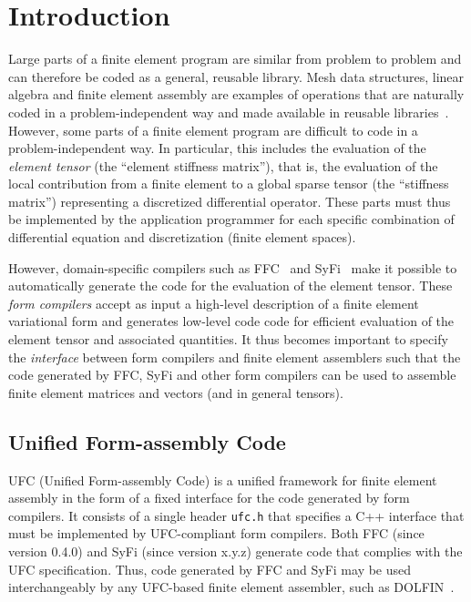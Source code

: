 \chapter{Introduction}
\label{sec:introduction}

Large parts of a finite element program are similar from problem to
problem and can therefore be coded as a general, reusable library.
Mesh data structures, linear algebra and finite element assembly are
examples of operations that are naturally coded in a
problem-independent way and made available in reusable
libraries~\cite{www:fenics,www:petsc,www:sundance,www:deal.II,www:trilinos,www:diffpack}.
However, some parts of a finite element program are difficult to code
in a problem-independent way. In particular, this includes the
evaluation of the \emph{element tensor} (the ``element stiffness
matrix''), that is, the evaluation of the local contribution from a
finite element to a global sparse tensor (the ``stiffness matrix'')
representing a discretized differential operator. These parts must
thus be implemented by the application programmer for each specific
combination of differential equation and discretization (finite
element spaces).

However, domain-specific compilers such as
FFC~\cite{www:ffc,logg:article:07,logg:article:09,logg:article:10,logg:article:11}
and SyFi~\cite{www:syfi} make it possible to automatically generate
the code for the evaluation of the element tensor. These \emph{form
compilers} accept as input a high-level description of a finite
element variational form and generates low-level code code for
efficient evaluation of the element tensor and associated quantities.
It thus becomes important to specify the \emph{interface} between form
compilers and finite element assemblers such that the code generated
by FFC, SyFi and other form compilers can be used to assemble finite
element matrices and vectors (and in general tensors).

\section{Unified Form-assembly Code}

UFC (Unified Form-assembly Code) is a unified framework for finite
element assembly in the form of a fixed interface for the code
generated by form compilers. It consists of a single header
\texttt{ufc.h} that specifies a C++ interface that must be implemented
by UFC-compliant form compilers. Both FFC (since version 0.4.0) and
SyFi (since version x.y.z) generate code that complies with the UFC
specification. Thus, code generated by FFC and SyFi may be used
interchangeably by any UFC-based finite element assembler, such as
DOLFIN~\cite{www:dolfin}.

